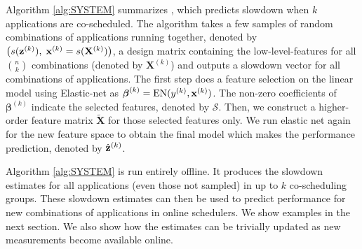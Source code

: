 
Algorithm \ref{alg:SYSTEM} summarizes \SYSTEMESP{}, which predicts
slowdown when $k$ applications are co-scheduled. The algorithm takes a
few samples of random combinations of applications running together,
denoted by $\left( s(\mathbf{z}^{(k)}), \; \mathbf{x}^{(k)} = s(\mathbf{X}^{(k)})
\right)$, a design matrix containing the low-level-features for all
${n \choose k}$ combinations (denoted by $\mathbf{X}^{(k)}$) and
outputs a slowdown vector for all combinations of applications. The
first step does a feature selection on the linear model using
Elastic-net as $\boldsymbol{\beta}^{(k)} = \text{EN}(y^{(k)},
\mathbf{x}^{(k)})$. The non-zero coefficients of $\boldsymbol{\beta}^{(k)}$
indicate the selected features, denoted by $\mathcal{S}$. Then, we
construct a higher-order feature matrix $\tilde{\mathbf{X}}$ for those
selected features only. We run elastic net again for the new feature
space to obtain the final model which makes the performance
prediction, denoted by $\hat{\mathbf{z}}^{(k)}$.



Algorithm \ref{alg:SYSTEM} is run entirely offline.  It produces the
slowdown estimates for all applications (even those not sampled) in up
to $k$ co-scheduling groups.  These slowdown estimates can then be
used to predict performance for new combinations of applications in
online schedulers.  We show examples in the next section.  We also
show how the estimates can be trivially updated as new measurements
become available online.
